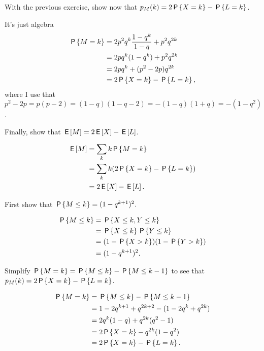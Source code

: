 \begin{exercise}
With the previous exercise, show now that $p_M(k) =2 \P{X=k} - \P{L=k}$.
\begin{solution}
It's just algebra
  \begin{align*}
\P{M=k}
&=2 p^{2}q^{k}\frac{1-q^{k}}{1-q} +  p^{2}q^{2k}\\
&=2 pq^{k}(1-q^{k}) + p^{2}q^{2k}\\
&=2 pq^{k} +(p^{2}-2p) q^{2k}\\
&=2 \P{X=k} - \P{L=k},
  \end{align*}
where I use that $p^{2}-2p = p(p-2) = (1-q)(1-q-2)=-(1-q)(1+q)=-(1-q^{2})$.
\end{solution}
\end{exercise}

\begin{exercise}
Finally, show that $\E M = 2 \E X  - \E L$.
\begin{hint}
\end{hint}
\begin{solution}
  \begin{align*}
\E M
&= \sum_k k \P{M=k}     \\
&=  \sum_{k}k (2\P{X=k} - \P{L=k}) \\
&= 2 \E X  - \E L.
  \end{align*}
\end{solution}
\end{exercise}


\begin{exercise}
First show that  $\P{M \leq k} = (1-q^{k+1})^{2}.$
\begin{solution}
  \begin{align*}
\P{M\leq k}
&= \P{X\leq k, Y\leq k} \\
&= \P{X\leq k}\P{Y\leq k} \\
&= (1-\P{X> k})(1-\P{Y> k}) \\
&= (1-q^{k+1})^{2}.
  \end{align*}
\end{solution}
\end{exercise}

\begin{exercise}
Simplify $\P{M=k} = \P{M\leq k} - \P{M\leq k-1}$ to see that $p_M(k) = 2\P{X=k} - \P{L=k}$.
\begin{solution}
  \begin{align*}
\P{M=k} &= \P{M\leq k} - \P{M\leq k-1}\\
&= 1-2 q^{k+1} + q^{2k+2} - (1 - 2q^{k} + q^{2k})\\
&= 2 q^{k}(1-q) + q^{2k}(q^{2}-1) \\
&= 2 \P{X=k}  - q^{2k}(1-q^{2}) \\
&= 2 \P{X=k}  - \P{L=k}.
  \end{align*}
\end{solution}
\end{exercise}


